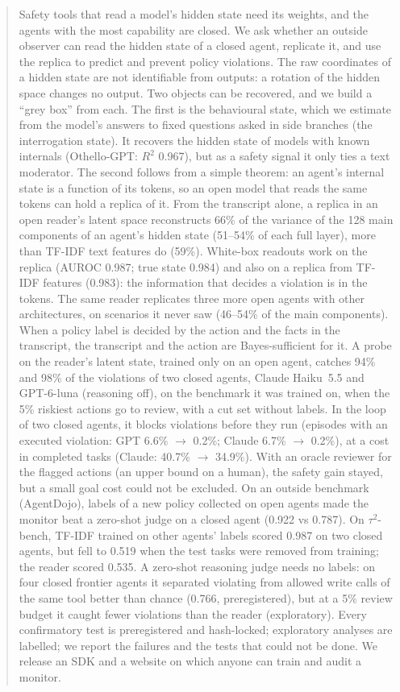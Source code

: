 \documentclass{article}
\begin{document}
\begin{abstract}
Safety tools that read a model's hidden state need its weights, and the agents with the most capability are closed.
We ask whether an outside observer can read the hidden state of a closed agent, replicate it, and use the replica to predict and prevent policy violations.
The raw coordinates of a hidden state are not identifiable from outputs: a rotation of the hidden space changes no output.
Two objects can be recovered, and we build a ``grey box'' from each.
The first is the behavioural state, which we estimate from the model's answers to fixed questions asked in side branches (the interrogation state).
It recovers the hidden state of models with known internals (Othello-GPT: $R^2$ 0.967), but as a safety signal it only ties a text moderator.
The second follows from a simple theorem: an agent's internal state is a function of its tokens, so an open model that reads the same tokens can hold a replica of it.
From the transcript alone, a replica in an open reader's latent space reconstructs 66\% of the variance of the 128 main components of an agent's hidden state (51--54\% of each full layer), more than TF-IDF text features do (59\%). White-box readouts work on the replica (AUROC 0.987; true state 0.984) and also on a replica from TF-IDF features (0.983): the information that decides a violation is in the tokens. The same reader replicates three more open agents with other architectures, on scenarios it never saw (46--54\% of the main components).
When a policy label is decided by the action and the facts in the transcript, the transcript and the action are Bayes-sufficient for it.
A probe on the reader's latent state, trained only on an open agent, catches 94\% and 98\% of the violations of two closed agents, Claude Haiku~5.5 and GPT-6-luna (reasoning off), on the benchmark it was trained on, when the 5\% riskiest actions go to review, with a cut set without labels.
In the loop of two closed agents, it blocks violations before they run (episodes with an executed violation: GPT 6.6\% $\rightarrow$ 0.2\%; Claude 6.7\% $\rightarrow$ 0.2\%), at a cost in completed tasks (Claude: 40.7\% $\rightarrow$ 34.9\%). With an oracle reviewer for the flagged actions (an upper bound on a human), the safety gain stayed, but a small goal cost could not be excluded.
On an outside benchmark (AgentDojo), labels of a new policy collected on open agents made the monitor beat a zero-shot judge on a closed agent (0.922 vs 0.787). On $\tau^2$-bench, TF-IDF trained on other agents' labels scored 0.987 on two closed agents, but fell to 0.519 when the test tasks were removed from training; the reader scored 0.535. A zero-shot reasoning judge needs no labels: on four closed frontier agents it separated violating from allowed write calls of the same tool better than chance (0.766, preregistered), but at a 5\% review budget it caught fewer violations than the reader (exploratory).
Every confirmatory test is preregistered and hash-locked; exploratory analyses are labelled; we report the failures and the tests that could not be done.
We release an SDK and a website on which anyone can train and audit a monitor.
\end{abstract}
\end{document}
